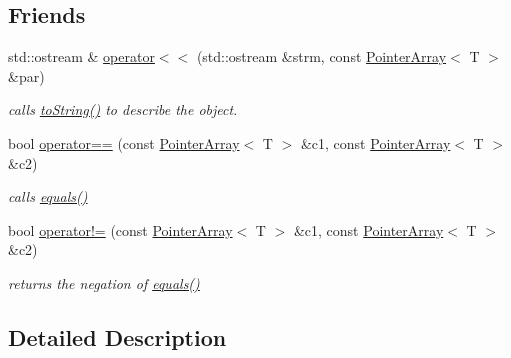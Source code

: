 \subsection*{Friends}
\begin{DoxyCompactItemize}
\item 
\hypertarget{classplist_1_1PointerArray_a081ebddab3580154920d0739f567551d}{std\-::ostream \& \hyperlink{classplist_1_1PointerArray_a081ebddab3580154920d0739f567551d}{operator$<$$<$} (std\-::ostream \&strm, const \hyperlink{classplist_1_1PointerArray}{Pointer\-Array}$<$ T $>$ \&par)}\label{classplist_1_1PointerArray_a081ebddab3580154920d0739f567551d}

\begin{DoxyCompactList}\small\item\em calls \hyperlink{classplist_1_1PointerArray_adbfcc2925aca65a903cb2d13b5439601}{to\-String()} to describe the object. \end{DoxyCompactList}\item 
\hypertarget{classplist_1_1PointerArray_a050d55aeebf51f02bf59d8352664528d}{bool \hyperlink{classplist_1_1PointerArray_a050d55aeebf51f02bf59d8352664528d}{operator==} (const \hyperlink{classplist_1_1PointerArray}{Pointer\-Array}$<$ T $>$ \&c1, const \hyperlink{classplist_1_1PointerArray}{Pointer\-Array}$<$ T $>$ \&c2)}\label{classplist_1_1PointerArray_a050d55aeebf51f02bf59d8352664528d}

\begin{DoxyCompactList}\small\item\em calls \hyperlink{classplist_1_1PointerArray_a55476b79cea967f390eec0093a8338c1}{equals()} \end{DoxyCompactList}\item 
\hypertarget{classplist_1_1PointerArray_a8ef9d256b362ccc682a1ad998f92beda}{bool \hyperlink{classplist_1_1PointerArray_a8ef9d256b362ccc682a1ad998f92beda}{operator!=} (const \hyperlink{classplist_1_1PointerArray}{Pointer\-Array}$<$ T $>$ \&c1, const \hyperlink{classplist_1_1PointerArray}{Pointer\-Array}$<$ T $>$ \&c2)}\label{classplist_1_1PointerArray_a8ef9d256b362ccc682a1ad998f92beda}

\begin{DoxyCompactList}\small\item\em returns the negation of \hyperlink{classplist_1_1PointerArray_a55476b79cea967f390eec0093a8338c1}{equals()} \end{DoxyCompactList}\end{DoxyCompactItemize}


\subsection{Detailed Description}
